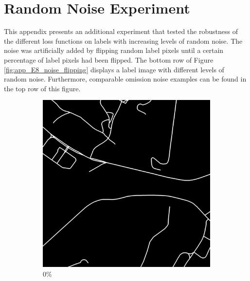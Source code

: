\section{Random Noise Experiment}
\label{app:randomnoiseexperiment}
This appendix presents an additional experiment that tested the robustness of the different loss functions on labels with increasing levels of random noise. The noise was artificially added by flipping random label pixels until a certain percentage of label pixels had been flipped. The bottom row of Figure \ref{fig:app_E8_noise_flipping} displays a label image with different levels of random noise. Furthermore, comparable omission noise examples can be found in the top row of this figure.\\


\begin{figure}[!b]
\begin{subfigure}{0.31\textwidth}
\includegraphics[width=\linewidth]{figs/E8/omission/noise0.png}
\caption{0\%}
\end{subfigure}
\hspace*{\fill} %
\begin{subfigure}{0.31\textwidth}

\end{subfigure}
\end{figure}
